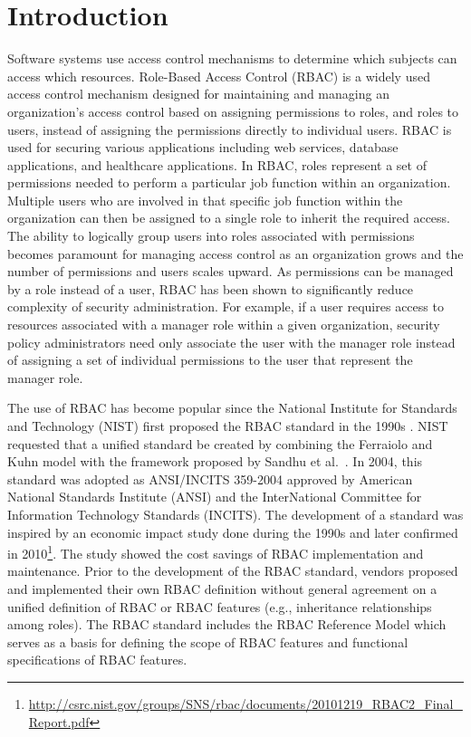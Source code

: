 \section{Introduction} \label{sec:introduction}

Software systems use access control mechanisms to determine which subjects can access
which resources.
Role-Based Access Control (RBAC) is a widely used access control mechanism designed for maintaining and managing an organization's 
access control based on assigning permissions to roles, and roles to users, instead of 
assigning the permissions directly to individual users.
RBAC is used for securing 
various applications including web services, database applications, and healthcare applications. 
In RBAC, roles represent a set of permissions needed to perform a particular job function within an organization.  
Multiple users who are involved in that specific job function within the organization can then be 
assigned to a single role to inherit the required access. 
The ability to logically group users into roles associated with permissions becomes paramount for managing access control as an organization grows
and the number of permissions and users scales upward.
As permissions can be managed by a role instead of a user, RBAC has been shown to significantly reduce complexity of security
administration.
For example, if a user requires access to resources 
associated with a manager role within a given organization, security policy administrators need only associate the user with the manager role instead
of assigning a set of individual permissions to the user that represent the manager role.


The use of RBAC has become popular since the National Institute for Standards and Technology (NIST) 
first proposed the RBAC standard in the 1990s \cite{o20102010}.
NIST requested that a unified standard be created by combining the Ferraiolo and Kuhn model \cite{ferraiolokuhn} with the framework 
proposed by Sandhu et al.~\cite{sandhu1996role}.  
In 2004, this standard was adopted as ANSI/INCITS 359-2004 approved by American National Standards Institute (ANSI) and the InterNational Committee for Information Technology Standards (INCITS). 
The development of a standard was inspired by an economic impact study done during the 1990s and later confirmed in 2010\footnote{\url{http://csrc.nist.gov/groups/SNS/rbac/documents/20101219_RBAC2_Final_Report.pdf}}. The study showed the cost savings of RBAC implementation and maintenance. 
Prior to the development of the RBAC standard, vendors proposed and implemented their own RBAC definition without general agreement on a unified definition of RBAC or RBAC features (e.g., inheritance relationships among roles). The RBAC standard includes the RBAC Reference Model which serves as a basis for defining the scope of RBAC features and functional specifications of RBAC features.

